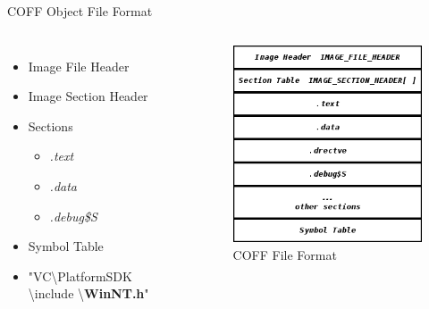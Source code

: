 \begin{frame}[t]{COFF Object File Format}
    \begin{columns}[t]
        \begin{itemize}
            \item Image File Header
            \item Image Section Header
            \item Sections
            \begin{itemize}
                \item \emph{.text}
                \item \emph{.data}
                \item \emph{.debug\$S}
            \end{itemize}
            \item Symbol Table
            \item "VC\textbackslash PlatformSDK \textbackslash include \textbackslash \textbf{WinNT.h}"
        \end{itemize}
        \begin{figure}
            \begin{center}
                \includegraphics[width=\textwidth]{./image/COFFObjFormat.png}
                \caption{COFF File Format}
            \end{center}
        \end{figure}
    \end{columns}
\end{frame}

